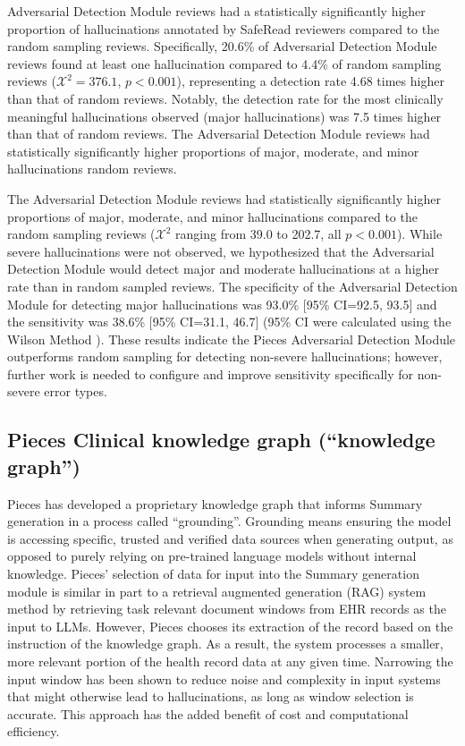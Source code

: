 \documentclass{style/myclass}
\begin{document}
Adversarial Detection Module reviews had a statistically significantly higher proportion of hallucinations annotated by SafeRead reviewers compared to the random sampling reviews. Specifically, 20.6\% of Adversarial Detection Module reviews found at least one hallucination compared to 4.4\% of random sampling reviews ($\mathcal{X}^2 = 376.1$, $p <0.001$), representing a detection rate 4.68 times higher than that of random reviews. Notably, the detection rate for the most clinically meaningful hallucinations observed (major hallucinations) was 7.5 times higher than that of random reviews. The Adversarial Detection Module reviews had statistically significantly higher proportions of major, moderate, and minor hallucinations random reviews.

The Adversarial Detection Module reviews had statistically significantly higher proportions of major, moderate, and minor hallucinations compared to the random sampling reviews ($\mathcal{X}^2$ ranging from 39.0 to 202.7, all $p <0.001$). While severe hallucinations were not observed, we hypothesized that the Adversarial Detection Module would detect major and moderate hallucinations at a higher rate than in random sampled reviews. The specificity of the Adversarial Detection Module for detecting major hallucinations was 93.0\% [95\% CI=92.5, 93.5] and the sensitivity was 38.6\% [95\% CI=31.1, 46.7] (95\% CI were calculated using the Wilson Method \cite{10}). These results indicate the Pieces Adversarial Detection Module outperforms random sampling for detecting non-severe hallucinations; however, further work is needed to configure and improve sensitivity specifically for non-severe error types.

\subsection{Pieces Clinical knowledge graph (“knowledge graph”)}

Pieces has developed a proprietary knowledge graph that informs Summary generation in a process called “grounding”. Grounding means ensuring the model is accessing specific, trusted and verified data sources when generating output, as opposed to purely relying on pre-trained language models without internal knowledge. \cite{11} Pieces’ selection of data for input into the Summary generation module is similar in part to a retrieval augmented generation (RAG) system method by retrieving task relevant document windows from EHR records as the input to LLMs. \cite{12,13} However, Pieces chooses its extraction of the record based on the instruction of the knowledge graph. As a result, the system processes a smaller, more relevant portion of the health record data at any given time. Narrowing the input window has been shown to reduce noise and complexity in input systems that might otherwise lead to hallucinations, as long as window selection is accurate. \cite{14} This approach has the added benefit of cost and computational efficiency.
\end{document}
